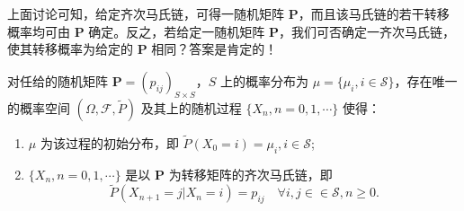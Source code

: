 \documentclass[lang=cn,10pt,thmcnt=section]{elegantbook}
\begin{document}
上面讨论可知，给定齐次马氏链，可得一随机矩阵 $\mathbf{P}$，而且该马氏链的若干转移概率均可由 $\mathbf{P}$ 确定。反之，若给定一随机矩阵 $\mathbf{P}$，我们可否确定一齐次马氏链，使其转移概率为给定的 $\mathbf{P}$ 相同？答案是肯定的！

\begin{theorem}[马氏链的存在性]
	 对任给的随机矩阵 $\mathbf{P} = (p_{ij})_{S \times S}$，$S$ 上的概率分布为 $\mu = \{\mu_i, i \in \mathcal{S}\}$，存在唯一的概率空间 $(\Omega, \mathcal{F}, \tilde P)$ 及其上的随机过程 $\{X_n, n = 0, 1, \cdots\}$ 使得：
\begin{enumerate}
    \item $\mu$ 为该过程的初始分布，即 $\tilde P(X_0 = i) = \mu_i, i \in \mathcal{S}$;
    \item $\{X_n, n = 0, 1, \cdots\}$ 是以 $\mathbf{P}$ 为转移矩阵的齐次马氏链，即
    \[
    \tilde P(X_{n+1} = j | X_n = i) = p_{ij} \quad \forall i, j \in \in \mathcal{S}, n \geq 0.
    \]
\end{enumerate}
\end{theorem}
\end{document}
